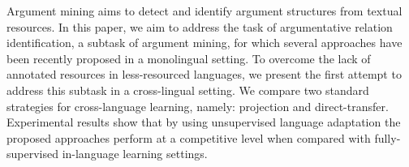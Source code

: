 Argument mining aims to detect and identify argument structures from textual resources. In this paper, we aim to address the task of argumentative relation identification, a subtask of argument mining, for which several approaches have been recently proposed in a monolingual setting. To overcome the lack of annotated resources in less-resourced languages, we present the first attempt to address this subtask in a cross-lingual setting. We compare two standard strategies for cross-language learning, namely: projection and direct-transfer. Experimental results show that by using unsupervised language adaptation the proposed approaches perform at a competitive level when compared with fully-supervised in-language learning settings.
